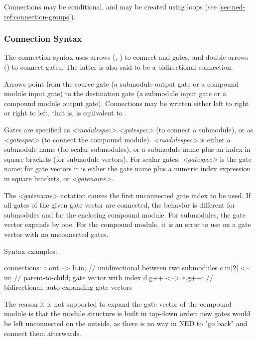Connections may be conditional, and may be created using loops (see
\ref{sec:ned-ref:connection-groups}).


\subsubsection{Connection Syntax}
\label{sec:ned-ref:connection-syntax}

The connection syntax uses arrows (\ttt{-{}->}, \ttt{<-{}-}) to connect
 and  gates, and double arrows
(\ttt{<-{}->}) to connect  gates. The latter is
also said to be a bidirectional connection.

Arrows point from the source gate (a submodule output gate or a compound
module input gate) to the destination gate (a submodule input gate or a
compound module output gate). Connections may be written either left to right
or right to left, that is,  is equivalent to .

Gates are specified as \textit{<modulespec>.<gatespec>} (to connect a submodule),
or as \textit{<gatespec>} (to connect the compound module). \textit{<modulespec>}
is either a submodule name (for scalar submodules), or a submodule name plus
an index in square brackets (for submodule vectors). For scalar gates,
\textit{<gatespec>} is the gate name; for gate vectors it is either
the gate name plus a numeric index expression in square brackets,
or \textit{<gatename>}\ttt{++}.

The \textit{<gatename>}\ttt{++} notation causes the first unconnected gate index
to be used. If all gates of the given gate vector are connected, the behavior
is different for submodules and for the enclosing compound module.
For submodules, the gate vector expands by one. For the compound module,
it is an error to use \ttt{++} on a gate vector with no unconnected gates.

Syntax examples:

\begin{ned}
connections:
   a.out --> b.in;   // unidirectional between two submodules
   c.in[2] <-- in;   // parent-to-child; gate vector with index
   d.g++ <--> e.g++; // bidirectional, auto-expanding gate vectors
\end{ned}

\begin{rationale}
    The reason it is not supported to expand the gate vector of the compound
    module is that the module structure is built in top-down order: new gates
    would be left unconnected on the outside, as there is no way in NED to
    "go back" and connect them afterwards.
\end{rationale}

